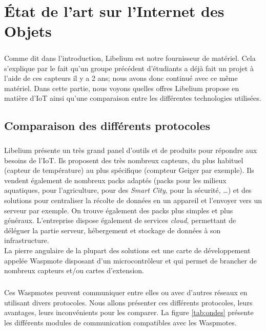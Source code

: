 \chapter{État de l'art sur l'Internet des Objets}
\label{chap:etat-art}

\paragraph{} Comme dit dans l'introduction, Libelium est notre fournisseur de matériel. Cela s'explique par le fait qu'un groupe précédent d'étudiants a déjà fait un projet à l'aide de ces capteurs il y a 2 ans; nous avons donc continué avec ce même matériel. Dans cette partie, nous voyons quelles offres Libelium propose en matière d'IoT ainsi qu'une comparaison entre les différentes technologies utilisées. 

\section{Comparaison des différents protocoles}
    \paragraph{}Libelium présente un très grand panel d'outils et de produits pour répondre aux besoins de l'IoT. Ils proposent des très nombreux capteurs, du plus habituel (capteur de température) au plus spécifique (compteur Geiger par exemple). Ils vendent également de nombreux packs adaptés (packs pour les milieux aquatiques, pour l'agriculture, pour des \emph{Smart City}, pour la sécurité, \dots) et des solutions pour centraliser la récolte de données en un appareil et l'envoyer vers un serveur par exemple. On trouve également des packs plus simples et plus généraux. L'entreprise dispose également de services \emph{cloud}, permettant de déléguer la partie serveur, hébergement et stockage de données à son infrastructure.\\
    La pierre angulaire de la plupart des solutions est une carte de développement appelée Waspmote disposant d'un microcontrôleur et qui permet de brancher de nombreux capteurs et/ou cartes d'extension.

    \paragraph{} Ces Waspmotes peuvent communiquer entre elles ou avec d'autres réseaux en utilisant divers protocoles. Nous allons présenter ces différents protocoles, leurs avantages, leurs inconvénients pour les comparer. La figure \ref{tab:ondes} présente les différents modules de communication compatibles avec les Waspmotes. 
    
